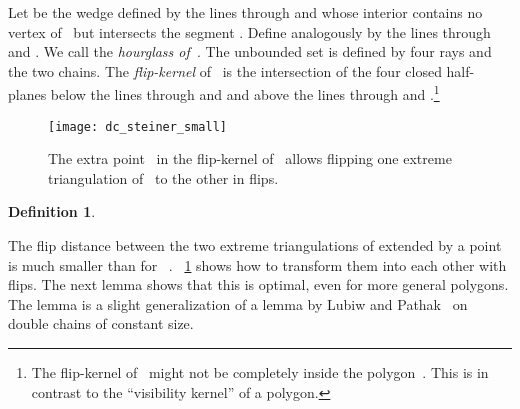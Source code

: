 \documentclass[a4paper,11pt]{article}
\newtheorem{definition}[theorem]{Definition}
\begin{document}
Let  be the wedge defined by the lines through  and
 whose interior contains no vertex of~ but intersects the segment .
Define  analogously by the lines through  and .
We call  the \emph{hourglass of~}.
The unbounded set  is defined by four rays and the two chains.
The \emph{flip-kernel} of~ is the intersection of the four closed half-planes below the lines through  and  and above the lines through  and .\footnote{The flip-kernel of~ might not be completely inside the polygon~.
This is in contrast to the ``visibility kernel'' of a polygon.}

\begin{figure}
\centering
\texttt{[image: dc\_steiner\_small]}
\caption{The extra point~ in the flip-kernel of~ allows flipping one extreme triangulation
of~ to the other in  flips.}
\label{fig_dc_steiner}
\end{figure}

\begin{definition}\label{def_p_d_plus}
\end{definition}

The flip distance between the two extreme
triangulations of  extended by a point~ is much
smaller than for ~\cite{problemas}.
\figurename~\ref{fig_dc_steiner} shows how to 
transform them into each other with  flips.
The next lemma shows that this is optimal, even for more general polygons.
The lemma is a slight generalization of a lemma by Lubiw and Pathak~\cite{lubiw} on double chains of constant size.
\end{document}
